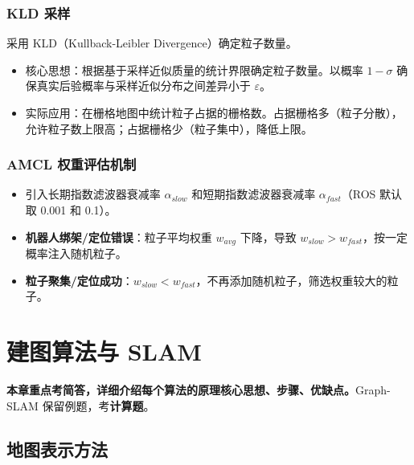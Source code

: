 \documentclass[11pt,a4paper]{article}
\begin{document}
\subsubsection*{KLD 采样}
采用 KLD（Kullback-Leibler Divergence）确定粒子数量。
\begin{itemize}
  \item 核心思想：根据基于采样近似质量的统计界限确定粒子数量。以概率 $1-\sigma$ 确保真实后验概率与采样近似分布之间差异小于 $\varepsilon$。
  \item 实际应用：在栅格地图中统计粒子占据的栅格数。占据栅格多（粒子分散），允许粒子数上限高；占据栅格少（粒子集中），降低上限。
\end{itemize}

\subsubsection*{AMCL 权重评估机制}
\begin{itemize}
  \item 引入长期指数滤波器衰减率 $\alpha_{slow}$ 和短期指数滤波器衰减率 $\alpha_{fast}$（ROS 默认取 0.001 和 0.1）。
  \item \textbf{机器人绑架/定位错误}：粒子平均权重 $w_{avg}$ 下降，导致 $w_{slow}>w_{fast}$，按一定概率注入随机粒子。
  \item \textbf{粒子聚集/定位成功}：$w_{slow}<w_{fast}$，不再添加随机粒子，筛选权重较大的粒子。
\end{itemize}

\section{建图算法与 SLAM}

\begin{keypoint}
\textbf{本章重点考简答，详细介绍每个算法的原理核心思想、步骤、优缺点。}Graph-SLAM 保留例题，考\textbf{计算题}。
\end{keypoint}

\subsection{地图表示方法}
\end{document}
